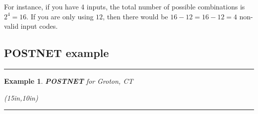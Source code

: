 \documentclass[12pt]{article}
\newtheorem{example}{Example}
\newenvironment{examp}
{\vspace{0.5cm}
\hrule
\begin{example}}
{\hrule
\vspace{0.5cm}
\end{example}}
\begin{document}
For instance, if you have 4 inputs, the total number of possible combinations
is \(2^4 = 16\). If you are only using $12$, then there would be \(16 - 12 =
16 - 12  = 4\)  non-valid input codes.
\subsection*{\textbf{POSTNET} example}
\begin{examp}
	\vspace{.3mm}
	\textbf{POSTNET} for Groton, CT
	\vspace{.5cm}
	\begin{center}
		\begin{pspicture}(15in,10in)
		\end{pspicture}
	\end{center}
\end{examp}
\end{document}
